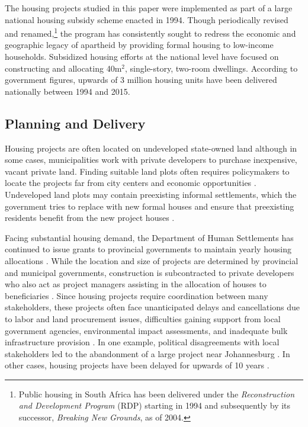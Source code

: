 \documentclass[12pt]{article}
\begin{document}
The housing projects studied in this paper were implemented as part of a large national housing subsidy scheme enacted in 1994. Though periodically revised and renamed,\footnote{Public housing in South Africa has been delivered under the {\it Reconstruction and Development Program} (RDP) starting in 1994 and subsequently by its successor, {\it Breaking New Grounds}, as of 2004.} the program has consistently sought to redress the economic and geographic legacy of apartheid by providing formal housing to low-income households. Subsidized housing efforts at the national level have focused on constructing and allocating 40m$^2$, single-story, two-room dwellings. According to government figures, upwards of 3 million housing units have been delivered nationally between 1994 and 2015.

\subsection{Planning and Delivery}

Housing projects are often located on undeveloped state-owned land although in some cases, municipalities work with private developers to purchase inexpensive, vacant private land.  Finding suitable land plots often requires policymakers to locate the projects far from city centers and economic opportunities \citep{dhsreports}.  Undeveloped land plots may contain preexisting informal settlements, which the government tries to replace with new formal houses and ensure that preexisting residents benefit from the new project houses \citep{serihistory}.

Facing substantial housing demand, the Department of Human Settlements has continued to issue grants to provincial governments to maintain yearly housing allocations \citep{dhsreports}.  While the location and size of projects are determined by provincial and municipal governments, construction is subcontracted to private developers who also act as project managers assisting in the allocation of houses to beneficiaries \citep{seriq}. Since housing projects require coordination between many stakeholders, these pro\-jects often face unanticipated delays and cancellations due to labor and land procurement issues, difficulties gaining support from local government agencies, environmental impact assessments, and inadequate bulk infrastructure provision \citep{dhsreports}.  In one example, political disagreements with local stakeholders led to the abandonment of a large project near Johannesburg \citep{protest}.  In other cases, housing projects have been delayed for upwards of 10 years \citep{dagpl}. 
\end{document}
